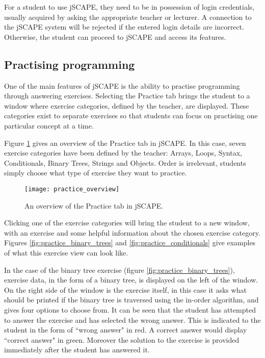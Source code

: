 For a student to use jSCAPE, they need to be in possession of login credentials, usually acquired by asking the appropriate teacher or lecturer. A connection to the jSCAPE system will be rejected if the entered login details are incorrect. Otherwise, the student can proceed to jSCAPE and access its features.

\subsection{Practising programming}
One of the main features of jSCAPE is the ability to practise programming through answering exercises. Selecting the Practice tab brings the student to a window where exercise categories, defined by the teacher, are displayed. These categories exist to separate exercises so that students can focus on practising one particular concept at a time. \newline

Figure \ref{fig:practice_overview} gives an overview of the Practice tab in jSCAPE. In this case, seven exercise categories have been defined by the teacher: Arrays, Loops, Syntax, Conditionals, Binary Trees, Strings and Objects. Order is irrelevant, students simply choose what type of exercise they want to practice.

\begin{figure}[H]
\centering
\texttt{[image: practice\_overview]}
\caption{An overview of the Practice tab in jSCAPE.}
\label{fig:practice_overview}
\end{figure}

Clicking one of the exercise categories will bring the student to a new window, with an exercise and some helpful information about the chosen exercise category.
Figures \ref{fig:practice_binary_trees} and \ref{fig:practice_conditionals} give examples of what this exercise view can look like.\newline

In the case of the binary tree exercise (figure \ref{fig:practice_binary_trees}), exercise data, in the form of a binary tree, is displayed on the left of the window. On the right side of the window is the exercise itself, in this case it asks what should be printed if the binary tree is traversed using the in-order algorithm, and gives four options to choose from. It can be seen that the student has attempted to answer the exercise and has selected the wrong answer. This is indicated to the student in the form of ``wrong answer" in red. A correct answer would display ``correct answer" in green. Moreover the solution to the exercise is provided immediately after the student has answered it.

